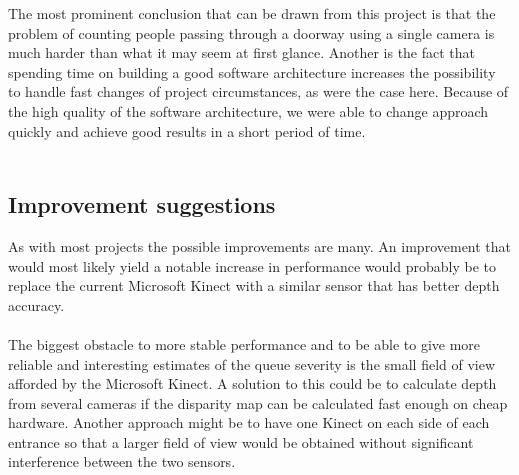The most prominent conclusion that can be drawn from this project is that the problem of counting people passing through a doorway using a single camera is much harder than what it may seem at first glance. Another is the fact that spending time on building a good software architecture increases the possibility to handle fast changes of project circumstances, as were the case here. Because of the high quality of the software architecture, we were able to change approach quickly and achieve good results in a short period of time.\\
\\

\subsection{Improvement suggestions}
As with most projects the possible improvements are many. An improvement that would most likely yield a notable increase in performance would probably be to replace the current Microsoft Kinect with a similar sensor that has better depth accuracy.
\\ \\The biggest obstacle to more stable performance and to be able to give more reliable and interesting estimates of the queue severity is the small field of view afforded by the Microsoft Kinect. A solution to this could be to calculate depth from several cameras if the disparity map can be calculated fast enough on cheap hardware. Another approach might be to have one Kinect on each side of each entrance so that a larger field of view would be obtained without significant interference between the two sensors. \\
\\

















